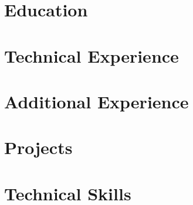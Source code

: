 


\pagestyle{empty}
\resumeHeader

\section{Education}


\section{Technical Experience}


\section{Additional Experience}


\section{Projects}


\section{Technical Skills}



